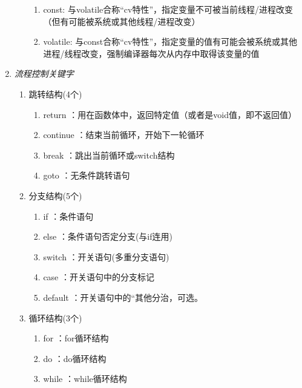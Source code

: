 \begin{enumerate}[label=\arabic*)]
\begin{enumerate}
\begin{enumerate}
			\item const: 与volatile合称“cv特性”，指定变量不可被当前线程/进程改变（但有可能被系统或其他线程/进程改变）
			\item volatile: 与const合称“cv特性”，指定变量的值有可能会被系统或其他进程/线程改变，强制编译器每次从内存中取得该变量的值
		\end{enumerate}	
	\end{enumerate}
	\item \textit{流程控制关键字}
	\begin{enumerate}
		\item 跳转结构(4个)
		\begin{enumerate}
			\item return ：用在函数体中，返回特定值（或者是void值，即不返回值）
			\item continue ：结束当前循环，开始下一轮循环
			\item break ：跳出当前循环或switch结构
			\item goto ：无条件跳转语句
		\end{enumerate}
		\item 分支结构(5个)
		\begin{enumerate}
			\item if ：条件语句
			\item else ：条件语句否定分支(与if连用)
			\item switch ：开关语句(多重分支语句)
			\item case ：开关语句中的分支标记
			\item default ：开关语句中的``其他分治，可选。
		\end{enumerate}
		\item 循环结构(3个)
		\begin{enumerate}
			\item for ：for循环结构
			\item do ：do循环结构
			\item while ：while循环结构
		\end{enumerate}	
	\end{enumerate}
\end{enumerate}


